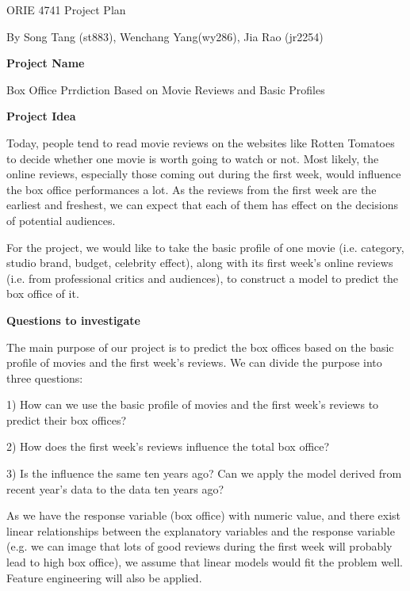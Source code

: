 \documentclass[twoside,10.5pt]{article}%
\begin{document}
\begin{center}
{\LARGE{ORIE 4741 Project Plan}}\\[20pt]
\end{center}
\begin{center}
{{By Song Tang (st883), Wenchang Yang(wy286), Jia Rao (jr2254)}}
\end{center}

\textbf{Project Name}

Box Office Prrdiction Based on Movie Reviews and Basic Profiles

\textbf{Project Idea}

Today, people tend to read movie reviews on the websites like Rotten Tomatoes to decide whether one movie is worth going to watch or not. Most likely, the online reviews, especially those coming out during the first week, would influence the box office performances a lot. As the reviews from the first week are the earliest and freshest, we can expect that each of them has effect on the decisions of potential audiences.

For the project, we would like to take the basic profile of one movie (i.e. category, studio brand, budget, celebrity effect), along with its first week’s online reviews (i.e. from professional critics and audiences), to construct a model to predict the box office of it.



\textbf{Questions to investigate}

The main purpose of our project is to predict the box offices based on the basic profile of movies and the first week's reviews. We can divide the purpose into three questions:

1) How can we use the basic profile of movies and the first week's reviews to predict their box offices?


2) How does the first week’s reviews influence the total box office?


3) Is the influence the same ten years ago? Can we apply the model derived from recent year’s data to the data ten years ago?


As we have the response variable (box office) with numeric value, and there exist linear relationships between the explanatory variables and the response variable (e.g. we can image that lots of good reviews during the first week will probably lead to high box office), we assume that linear models would fit the problem well. Feature engineering will also be applied.
\end{document}
